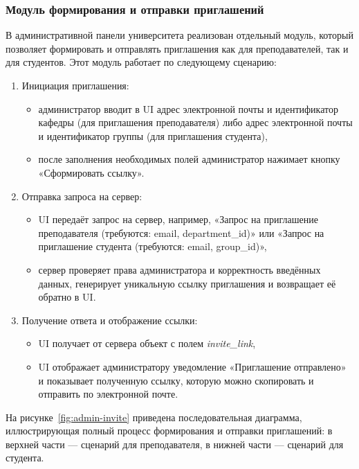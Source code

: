 \subsubsection{Модуль формирования и отправки приглашений}
В административной панели университета реализован отдельный модуль, который позволяет формировать и отправлять приглашения как для преподавателей, так и для студентов. Этот модуль работает по следующему сценарию:

\begin{enumerate}
    \item Инициация приглашения:
    \begin{itemize}
        \item администратор вводит в UI адрес электронной почты и идентификатор кафедры (для приглашения преподавателя) либо адрес электронной почты и идентификатор группы (для приглашения студента),
        \item после заполнения необходимых полей администратор нажимает кнопку «Сформировать ссылку».
    \end{itemize}
    \item Отправка запроса на сервер:
    \begin{itemize}
        \item UI передаёт запрос на сервер, например, «Запрос на приглашение преподавателя (требуются: email, department\_id)» или «Запрос на приглашение студента (требуются: email, group\_id)»,
        \item сервер проверяет права администратора и корректность введённых данных, генерирует уникальную ссылку приглашения и возвращает её обратно в UI.
    \end{itemize}
    \item Получение ответа и отображение ссылки:
    \begin{itemize}
        \item UI получает от сервера объект с полем \textit{invite\_link},
        \item UI отображает администратору уведомление «Приглашение отправлено» и показывает полученную ссылку, которую можно скопировать и отправить по электронной почте.
    \end{itemize}
\end{enumerate}

На рисунке~\ref{fig:admin-invite} приведена последовательная диаграмма, иллюстрирующая полный процесс формирования и отправки приглашений: в верхней части — сценарий для преподавателя, в нижней части — сценарий для студента.

